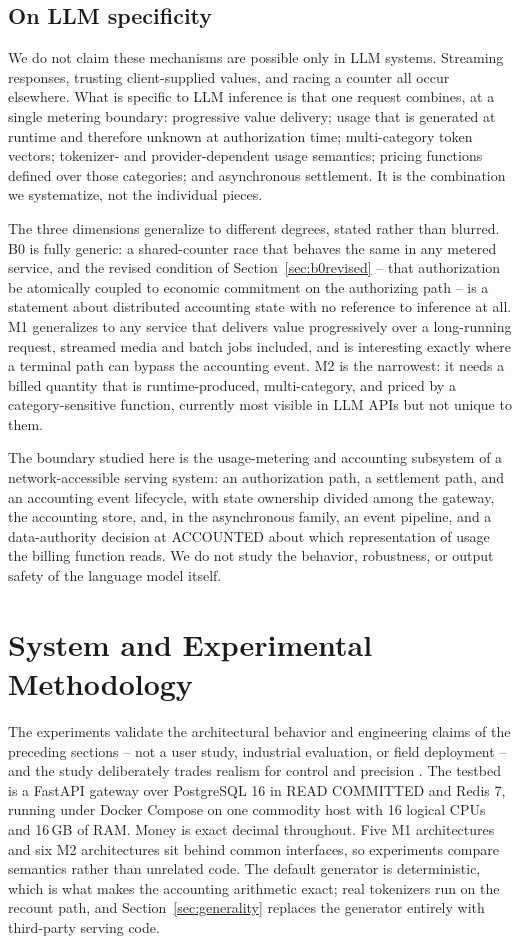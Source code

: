\documentclass[final,5p,times,twocolumn,number]{elsarticle}
\begin{document}
\subsection{On LLM specificity}
We do not claim these mechanisms are possible only in LLM systems. Streaming responses,
trusting client-supplied values, and racing a counter all occur elsewhere. What is
specific to LLM inference is that one request combines, at a single metering boundary:
progressive value delivery; usage that is generated at runtime and therefore unknown at
authorization time; multi-category token vectors; tokenizer- and provider-dependent usage
semantics; pricing functions defined over those categories; and asynchronous settlement.
It is the combination we systematize, not the individual pieces.

The three dimensions generalize to different degrees, stated rather than blurred. B0 is
fully generic: a shared-counter race that behaves the same in any metered service, and
the revised condition of Section~\ref{sec:b0revised} -- that authorization be atomically
coupled to economic commitment on the authorizing path -- is a statement about
distributed accounting state with no reference to inference at all. M1 generalizes to any
service that delivers value progressively over a long-running request, streamed media and
batch jobs included, and is interesting exactly where a terminal path can bypass the
accounting event. M2 is the narrowest: it needs a billed quantity that is
runtime-produced, multi-category, and priced by a category-sensitive function, currently
most visible in LLM APIs but not unique to them.

The boundary studied here is the usage-metering and accounting subsystem of a
network-accessible serving system: an authorization path, a settlement path, and an
accounting event lifecycle, with state ownership divided among the gateway, the
accounting store, and, in the asynchronous family, an event pipeline, and a
data-authority decision at ACCOUNTED about which representation of usage the billing
function reads. We do not study the behavior, robustness, or output safety of the
language model itself.

\section{System and Experimental Methodology}
\label{sec:method}
The experiments validate the architectural behavior and engineering claims of the
preceding sections -- not a user study, industrial evaluation, or field deployment -- and
the study deliberately trades realism for control and precision \citep{abc}. The testbed is a FastAPI gateway over PostgreSQL 16 in READ COMMITTED and Redis 7,
running under Docker Compose on one commodity host with 16 logical CPUs and 16\,GB of
RAM. Money is exact decimal throughout. Five M1 architectures and six M2 architectures
sit behind common interfaces, so experiments compare semantics rather than unrelated
code. The default generator is deterministic, which is what makes the accounting
arithmetic exact; real tokenizers run on the recount path, and
Section~\ref{sec:generality} replaces the generator entirely with third-party serving
code.
\end{document}
